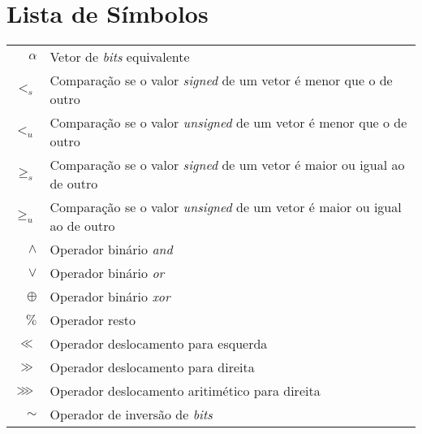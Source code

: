     \newcommand\disablenewpage[1]{{\let\clearpage\par\let\cleardoublepage\par #1}}
    
    \bgroup
    \raggedbottom
    
    
    \disablenewpage{\chapter*{Lista de Símbolos}}
    
    \begin{tabular}{rl}
      $\alpha$ & Vetor de \emph{bits} equivalente\\
      $<_s$ & Comparação se o valor \emph{signed} de um vetor é menor que o de outro\\
      $<_u$ & Comparação se o valor \emph{unsigned} de um vetor é menor que o de outro\\
      $\geq_s$ & Comparação se o valor \emph{signed} de um vetor é maior ou igual ao de outro\\
      $\geq_u$ & Comparação se o valor \emph{unsigned} de um vetor é maior ou igual ao de outro\\
      $\land$ & Operador binário \emph{and}\\
      $\lor$ & Operador binário \emph{or}\\
      $\oplus$ & Operador binário \emph{xor}\\
      $\%$ & Operador resto \\
      $\ll$ & Operador deslocamento para esquerda \\
      $\gg$ & Operador deslocamento para direita \\
      $\ggg$ & Operador deslocamento aritimético para direita \\
      $\sim$ & Operador de inversão de \emph{bits} \\
    \end{tabular}
    
